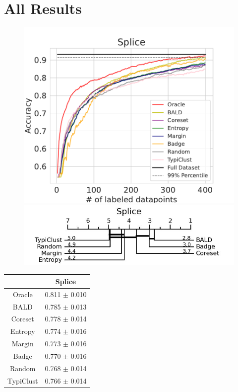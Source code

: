 \documentclass[]{article}
\begin{document}
\section{All Results}\label{app:all_results}
\begin{minipage}{0.65\linewidth}
\begin{figure}[H]
    \centering
    \includegraphics[width=\linewidth]{img/eval_splice}\\ [2mm]
    \includegraphics[width=\linewidth]{img/micro_splice.jpg}
\end{figure}
\end{minipage}
\begin{minipage}{0.29\linewidth}
\begin{tabular}{c|c}
    &Splice \\
    \hline
    Oracle&0.811 $\pm$ 0.010\\
    BALD&0.785 $\pm$ 0.013\\
    Coreset&0.778 $\pm$ 0.014\\
    Entropy&0.774 $\pm$ 0.016\\
    Margin&0.773 $\pm$ 0.016\\
    Badge&0.770 $\pm$ 0.016\\
    Random&0.768 $\pm$ 0.014\\
    TypiClust&0.766 $\pm$ 0.014\\
\end{tabular}
\end{minipage}
\end{document}
